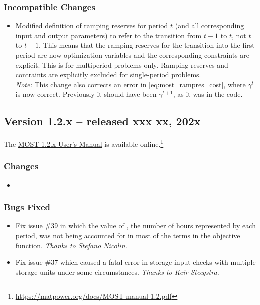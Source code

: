 \documentclass[12pt]{article}
\newcommand{\most}[0]{{MOST}}
\newcommand{\code}[1]{{\relsize{-0.5}{\tt{{#1}}}}}  %
\numberwithin{equation}{section}
\numberwithin{table}{section}
\numberwithin{figure}{section}
\begin{document}
\begin{appendices}
\subsubsection*{Incompatible Changes}
\begin{itemize}
\item Modified definition of ramping reserves for period $t$ (and all
corresponding input and output parameters) to refer to the transition
from $t-1$ to $t$, not $t$ to $t+1$. This means that the ramping
reserves for the transition into the first period are now optimization
variables and the corresponding constraints are explicit. This is for
multiperiod problems only. Ramping reserves and contraints are explicitly
excluded for single-period problems.\\
\emph{Note:} This change also corrects an error in
\eqref{eq:most_rampres_cost}, where $\gamma^t$ is now correct.
Previously it should have been $\gamma^{t+1}$, as it was in the code.
\end{itemize}


\subsection{Version 1.2.x -- released xxx xx, 202x}
\label{app:v12x}

The \href{https://matpower.org/docs/MOST-manual-1.2.x.pdf}{\most{} 1.2.x User's Manual} is available online.\footnote{\url{https://matpower.org/docs/MOST-manual-1.2.pdf}}

\subsubsection*{Changes}
\begin{itemize}
\item 

\end{itemize}

\subsubsection*{Bugs Fixed}
\begin{itemize}
\item Fix issue \#39 in which the value of \code{mdi.Delta\_T}, the number of hours represented by each period, was not being accounted for in most of the terms in the objective function. \emph{Thanks to Stefano Nicolin.}
\item Fix issue \#37 which caused a fatal error in storage input checks with multiple storage units under some circumstances. \emph{Thanks to Keir Steegstra.}
\end{itemize}


\end{appendices}
\end{document}
